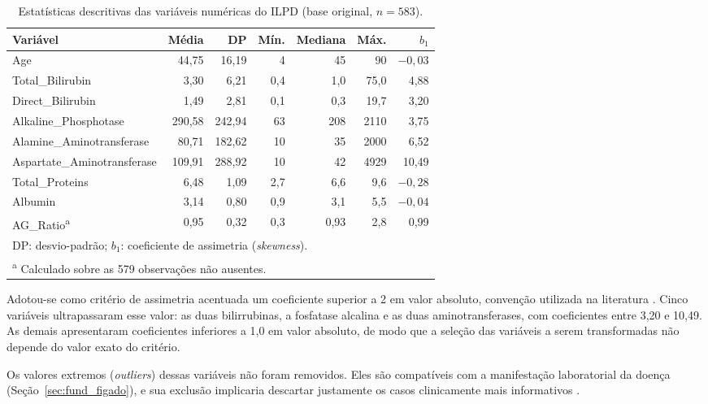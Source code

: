 \begin{table}[htbp]
\centering
\begin{tabular}{lrrrrrr}
\hline
\textbf{Variável} & \textbf{Média} & \textbf{DP} & \textbf{Mín.} & \textbf{Mediana} & \textbf{Máx.} & \textbf{$b_1$} \\
\hline
Age                         & 44,75  & 16,19  & 4    & 45   & 90    & $-0{,}03$ \\
Total\_Bilirubin            & 3,30   & 6,21   & 0,4  & 1,0  & 75,0  & 4,88 \\
Direct\_Bilirubin           & 1,49   & 2,81   & 0,1  & 0,3  & 19,7  & 3,20 \\
Alkaline\_Phosphotase       & 290,58 & 242,94 & 63   & 208  & 2110  & 3,75 \\
Alamine\_Aminotransferase   & 80,71  & 182,62 & 10   & 35   & 2000  & 6,52 \\
Aspartate\_Aminotransferase & 109,91 & 288,92 & 10   & 42   & 4929  & 10,49 \\
Total\_Proteins             & 6,48   & 1,09   & 2,7  & 6,6  & 9,6   & $-0{,}28$ \\
Albumin                     & 3,14   & 0,80   & 0,9  & 3,1  & 5,5   & $-0{,}04$ \\
AG\_Ratio\textsuperscript{a} & 0,95  & 0,32   & 0,3  & 0,93 & 2,8   & 0,99 \\
\hline
\multicolumn{7}{l}{\footnotesize DP: desvio-padrão; $b_1$: coeficiente de assimetria (\textit{skewness}).} \\
\multicolumn{7}{l}{\footnotesize \textsuperscript{a} Calculado sobre as 579 observações não ausentes.} \\
\end{tabular}
\caption{Estatísticas descritivas das variáveis numéricas do ILPD (base original, $n = 583$).}
\label{tab:descritivas}
\end{table}

Adotou-se como critério de assimetria acentuada um coeficiente superior a 2 em valor absoluto, convenção utilizada na literatura \cite[p.~26]{curran1996robustness}. Cinco variáveis ultrapassaram esse valor: as duas bilirrubinas, a fosfatase alcalina e as duas aminotransferases, com coeficientes entre 3,20 e 10,49. As demais apresentaram coeficientes inferiores a 1,0 em valor absoluto, de modo que a seleção das variáveis a serem transformadas não depende do valor exato do critério.

Os valores extremos (\textit{outliers}) dessas variáveis não foram removidos. Eles são compatíveis com a manifestação laboratorial da doença (Seção~\ref{sec:fund_figado}), e sua exclusão implicaria descartar justamente os casos clinicamente mais informativos \cite[p.~237]{Aggarwal2015}.

